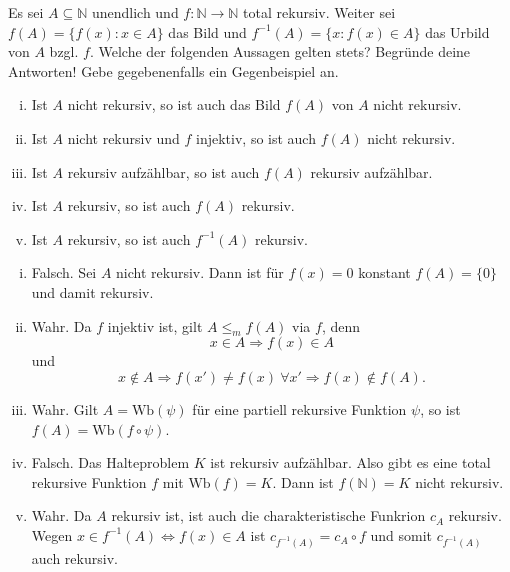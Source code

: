 \documentclass[german,headsepline]{scrartcl}
\begin{document}
	\begin{question}[subtitle={Klausur 2009}]
		Es sei $A\subseteq\mathbb{N}$ unendlich und $f:\mathbb{N}\to\mathbb{N}$ total rekursiv.
		Weiter sei $f(A)=\{f(x)\colon x\in A\}$ das Bild und $f^{-1}(A)=\{x\colon f(x)\in A\}$ das Urbild von $A$ bzgl. $f$.
		Welche der folgenden Aussagen gelten stets?
		Begründe deine Antworten! Gebe gegebenenfalls ein Gegenbeispiel an.
		\begin{enumerate}[(i)]
			\item Ist $A$ nicht rekursiv, so ist auch das Bild $f(A)$ von $A$ nicht rekursiv.
			\item Ist $A$ nicht rekursiv und $f$ injektiv, so ist auch $f(A)$ nicht rekursiv.
			\item Ist $A$ rekursiv aufzählbar, so ist auch $f(A)$ rekursiv aufzählbar.
			\item Ist $A$ rekursiv, so ist auch $f(A)$ rekursiv.
			\item Ist $A$ rekursiv, so ist auch $f^{-1}(A)$ rekursiv.
		\end{enumerate}
	\end{question}
	\begin{solution}
		\begin{enumerate}[(i)]
			\item Falsch. Sei $A$ nicht rekursiv. Dann ist für $f(x)=0$ konstant $f(A)=\{0\}$ und damit rekursiv.
			\item Wahr. Da $f$ injektiv ist, gilt $A\leq_mf(A)$ via $f$, denn
				\[x\in A\Rightarrow f(x)\in A\]
				und
				\[x\notin A\Rightarrow f(x')\neq f(x)~\forall x'\Rightarrow f(x)\notin f(A).\]
			\item Wahr. Gilt $A=\text{Wb}(\psi)$ für eine partiell rekursive Funktion $\psi$, so ist $f(A)=\text{Wb}(f\circ\psi)$.
			\item Falsch. Das Halteproblem $K$ ist rekursiv aufzählbar.
				Also gibt es eine total rekursive Funktion $f$ mit $\text{Wb}(f)=K$.
				Dann ist $f(\mathbb{N})=K$ nicht rekursiv.
			\item Wahr. Da $A$ rekursiv ist, ist auch die charakteristische Funkrion $c_A$ rekursiv.
				Wegen $x\in f^{-1}(A)\Leftrightarrow f(x)\in A$ ist $c_{f^{-1}(A)}=c_A\circ f$ und somit $c_{f^{-1}(A)}$ auch rekursiv.
		\end{enumerate}
	\end{solution}
	
\end{document}
